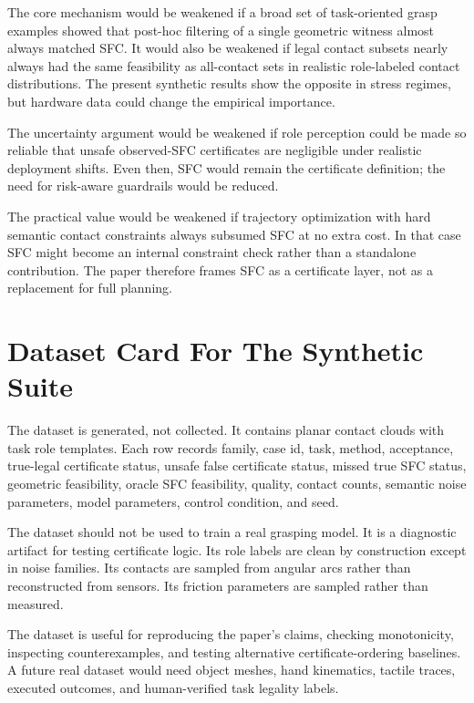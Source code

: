 \documentclass{article}
\begin{document}
The core mechanism would be weakened if a broad set of task-oriented grasp examples showed that post-hoc filtering of a single geometric witness almost always matched SFC. It would also be weakened if legal contact subsets nearly always had the same feasibility as all-contact sets in realistic role-labeled contact distributions. The present synthetic results show the opposite in stress regimes, but hardware data could change the empirical importance.

The uncertainty argument would be weakened if role perception could be made so reliable that unsafe observed-SFC certificates are negligible under realistic deployment shifts. Even then, SFC would remain the certificate definition; the need for risk-aware guardrails would be reduced.

The practical value would be weakened if trajectory optimization with hard semantic contact constraints always subsumed SFC at no extra cost. In that case SFC might become an internal constraint check rather than a standalone contribution. The paper therefore frames SFC as a certificate layer, not as a replacement for full planning.

\section{Dataset Card For The Synthetic Suite}

The dataset is generated, not collected. It contains planar contact clouds with task role templates. Each row records family, case id, task, method, acceptance, true-legal certificate status, unsafe false certificate status, missed true SFC status, geometric feasibility, oracle SFC feasibility, quality, contact counts, semantic noise parameters, model parameters, control condition, and seed.

The dataset should not be used to train a real grasping model. It is a diagnostic artifact for testing certificate logic. Its role labels are clean by construction except in noise families. Its contacts are sampled from angular arcs rather than reconstructed from sensors. Its friction parameters are sampled rather than measured.

The dataset is useful for reproducing the paper's claims, checking monotonicity, inspecting counterexamples, and testing alternative certificate-ordering baselines. A future real dataset would need object meshes, hand kinematics, tactile traces, executed outcomes, and human-verified task legality labels.
\end{document}
